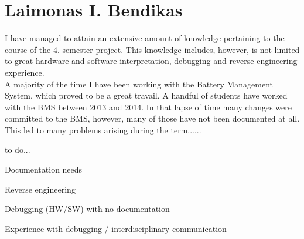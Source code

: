 \section{Laimonas I. Bendikas}
I have managed to attain an extensive amount of knowledge pertaining to the course of the 4. semester project. This knowledge includes, however, is not limited to great hardware and software interpretation, debugging and reverse engineering experience. \\
A majority of the time I have been working with the Battery Management System, which proved to be a great travail. A handful of students have worked with the BMS between 2013 and 2014. In that lapse of time many changes were committed to the BMS, however, many of those have not been documented at all. This led to many problems arising during the term......


to do...

Documentation needs

Reverse engineering

Debugging (HW/SW) with no documentation

Experience with debugging / interdisciplinary communication

